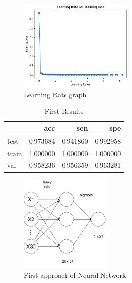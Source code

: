 \documentclass[12pt,a4paper,twocolumn]{article}
\begin{document}
\begin{figure}[ht!]
\centering
\includegraphics[width=0.5\textwidth]{images/learning_rate_training_loss.png}

\caption{\label{fig:learning_rate} 
Learning Rate graph}
\end{figure}



\begin{table}[h!]
\begin{tabular}{lrrr}
\toprule
{} &       acc &       sen &       spe \\
\midrule
test  &  0.973684 &  0.941860 &  0.992958 \\
train &  1.000000 &  1.000000 &  1.000000 \\
val   &  0.958236 &  0.956359 &  0.963281 \\
\bottomrule
\end{tabular}


    \caption{First Results}
    \label{tab:results_1}
\end{table}





\begin{figure}[H]

\includegraphics[width=0.4\textwidth]{images/NN.png}
\centering
\caption{\label{fig:NN} First approach of Neural Network}
\end{figure}
\end{document}
